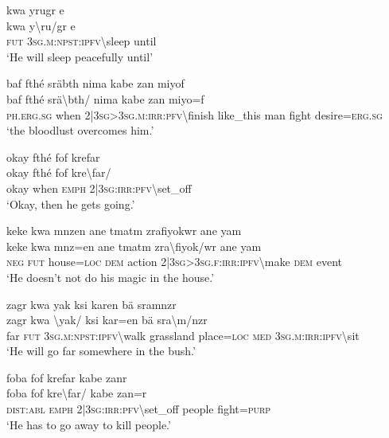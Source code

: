 \ea\label{ex:a4333}
kwa yrugr e\\
\gll kwa	y{\textbackslash}ru/gr	e\\
     \textsc{fut}	3\textsc{sg}.\textsc{m}:\textsc{npst}:\textsc{ipfv}{\textbackslash}sleep	until\\
\glt `He will sleep peacefully until'
\z

\ea\label{ex:a4334}
baf fthé sräbth nima kabe zan miyof\\
\gll baf	fthé	srä{\textbackslash}bth/	nima	kabe	zan	miyo=f\\
     \textsc{ph}.\textsc{erg}.\textsc{sg}	when	2|3\textsc{sg}>3\textsc{sg}.\textsc{m}:\textsc{irr}:\textsc{pfv}{\textbackslash}finish	like\_this	man	fight	desire=\textsc{erg}.\textsc{sg}\\
\glt `the bloodlust overcomes him.'
\z

\ea\label{ex:a4336}
okay fthé fof krefar\\
\gll okay	fthé	fof	kre{\textbackslash}far/\\
     okay	when	\textsc{emph}	2|3\textsc{sg}:\textsc{irr}:\textsc{pfv}{\textbackslash}set\_off\\
\glt `Okay, then he gets going.'
\z

\ea\label{ex:a4337}
keke kwa mnzen ane tmatm zrafiyokwr ane yam\\
\gll keke	kwa	mnz=en	ane	tmatm	zra{\textbackslash}fiyok/wr	ane	yam\\
     \textsc{neg}	\textsc{fut}	house=\textsc{loc}	\textsc{dem}	action	2|3\textsc{sg}>3\textsc{sg}.\textsc{f}:\textsc{irr}:\textsc{ipfv}{\textbackslash}make	\textsc{dem}	event\\
\glt `He doesn't not do his magic in the house.'
\z

\ea\label{ex:a4338}
zagr kwa yak ksi karen bä sramnzr\\
\gll zagr	kwa	{\textbackslash}yak/	ksi	kar=en	bä	sra{\textbackslash}m/nzr\\
     far	\textsc{fut}	3\textsc{sg}.\textsc{m}:\textsc{npst}:\textsc{ipfv}{\textbackslash}walk	grassland	place=\textsc{loc}	\textsc{med}	3\textsc{sg}.\textsc{m}:\textsc{irr}:\textsc{ipfv}{\textbackslash}sit\\
\glt `He will go far somewhere in the bush.'
\z

\ea\label{ex:a4339}
foba fof krefar kabe zanr\\
\gll foba	fof	kre{\textbackslash}far/	kabe	zan=r\\
     \textsc{dist}:\textsc{abl}	\textsc{emph}	2|3\textsc{sg}:\textsc{irr}:\textsc{pfv}{\textbackslash}set\_off	people	fight=\textsc{purp}\\
\glt `He has to go away to kill people.'
\z

